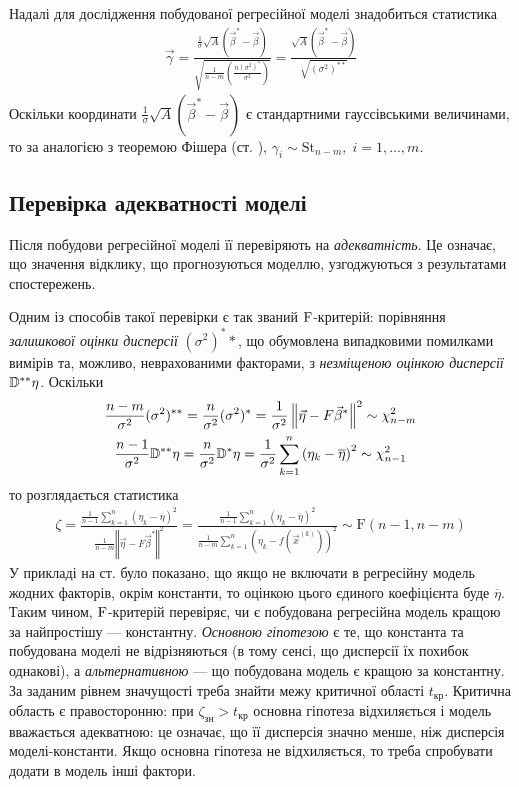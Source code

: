 Надалі для дослідження побудованої регресійної моделі знадобиться статистика
\begin{gather*}
    \vec{\gamma} = \frac{
        \frac{1}{\sigma} \sqrt{A}(\vec{\beta}^* - \vec{\beta})
    }{
        \sqrt{\frac{1}{n-m} \left(\frac{n (\sigma^2)^*}{\sigma^2}\right)}
    } = \frac{\sqrt{A}(\vec{\beta}^* - \vec{\beta})}{\sqrt{(\sigma^2)^{**}}}
\end{gather*}
Оскільки координати $\frac{1}{\sigma} \sqrt{A}(\vec{\beta}^* - \vec{\beta})$ є стандартними гауссівськими величинами,
то за аналогією з теоремою Фішера (ст. \pageref{Fisher_th}), $\gamma_i \sim \mathrm{St}_{n-m}, \; i = 1,..., m$.

\subsection{Перевірка адекватності моделі}
Після побудови регресійної моделі її перевіряють на \emph{адекватність}.
Це означає, що значення відклику, що прогнозуються моделлю, узгоджуються з результатами спостережень.

Одним із способів такої перевірки є так званий $\rm F$-критерій: порівняння \emph{залишкової оцінки дисперсії} $(\sigma^2)^**$, що обумовлена
випадковими помилками вимірів та, можливо, неврахованими факторами, з 
\emph{незміщеною оцінкою дисперсії} $\mathbb{D}^{**}\eta$. Оскільки
\begin{gather*}
    \frac{n-m}{\sigma^2} (\sigma^2)^{**}= 
    \frac{n}{\sigma^2}(\sigma^2)^* = \frac{1}{\sigma^2} \left\Vert \vec{\eta} - F \vec{\beta}^*\right\Vert^2 \sim \chi^2_{n-m} \\
    \frac{n-1}{\sigma^2} \mathbb{D}^{**}\eta = \frac{n}{\sigma^2} \mathbb{D}^* \eta = \frac{1}{\sigma^2} \sum\limits_{k=1}^n \left(\eta_k - \overline{\eta}\right)^2 \sim \chi^2_{n-1}
\end{gather*}
то розглядається статистика
\begin{gather}\label{f_test}
    \zeta = \frac{
        \frac{1}{n-1} \sum\limits_{k=1}^n \left(\eta_k - \overline{\eta}\right)^2
    }{
        \frac{1}{n-m} \left\Vert \vec{\eta} - F \vec{\beta}^*\right\Vert^2
    } = 
    \frac{
        \frac{1}{n-1} \sum\limits_{k=1}^n \left(\eta_k - \overline{\eta}\right)^2
    }{
        \frac{1}{n-m} \sum\limits_{k=1}^n \left(\eta_k - f\left(\vec{x}^{(k)}\right)\right)^2
    } \sim \mathrm{F}(n-1, n-m)
\end{gather}
У прикладі на ст. \pageref{intercept_fit} було показано, що якщо не включати
в регресійну модель жодних факторів, окрім константи, то оцінкою цього єдиного коефіцієнта буде $\overline{\eta}$.
Таким чином, $\rm F$-критерій перевіряє, чи є побудована регресійна модель кращою за найпростішу --- константну.
\emph{Основною гіпотезою} є те, що константа та побудована моделі не відрізняються (в тому сенсі, що дисперсії їх похибок однакові),
а \emph{альтернативною} --- що побудована модель є кращою за константну.
За заданим рівнем значущості треба знайти межу критичної області
$t_\text{кр}$. Критична область є правосторонню: при $\zeta_\text{зн} > t_\text{кр}$ основна гіпотеза відхиляється і
модель вважається адекватною: це означає, що її дисперсія значно менше, ніж дисперсія моделі-константи.
Якщо основна гіпотеза не відхиляється, то треба спробувати додати в модель інші фактори.

